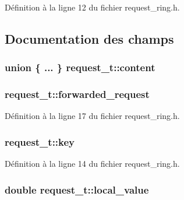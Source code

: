Définition à la ligne 12 du fichier request\+\_\+ring.\+h.



\subsection{Documentation des champs}
\hypertarget{structrequest__t_a6729b77b960ade21ba25c05752728d1d}{
\subsubsection[{content}]{\setlength{\rightskip}{0pt plus 5cm}union \{ ... \}   request\+\_\+t\+::content}}\label{structrequest__t_a6729b77b960ade21ba25c05752728d1d}
\hypertarget{structrequest__t_a89f0d4bedb0b3309d3788d83361fca7b}{
\subsubsection[{forwarded\+\_\+request}]{ request\+\_\+t\+::forwarded\+\_\+request}}\label{structrequest__t_a89f0d4bedb0b3309d3788d83361fca7b}


Définition à la ligne 17 du fichier request\+\_\+ring.\+h.

\hypertarget{structrequest__t_aecda29724bf99d52cb493c1230c78c56}{
\subsubsection[{key}]{ request\+\_\+t\+::key}}\label{structrequest__t_aecda29724bf99d52cb493c1230c78c56}


Définition à la ligne 14 du fichier request\+\_\+ring.\+h.

\hypertarget{structrequest__t_adfaf572f76ed3e073cf055e07fc2c78b}{
\subsubsection[{local\+\_\+value}]{\setlength{\rightskip}{0pt plus 5cm}double request\+\_\+t\+::local\+\_\+value}}\label{structrequest__t_adfaf572f76ed3e073cf055e07fc2c78b}


